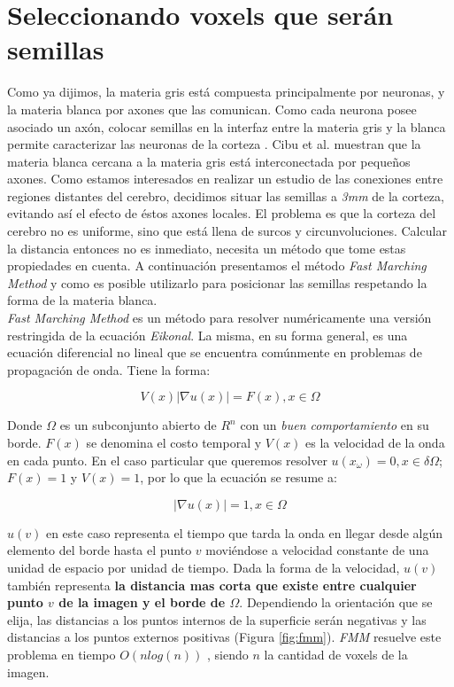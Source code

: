 \section{Seleccionando voxels que ser\'an semillas}
\label{sec:semillas}

Como ya dijimos, la materia gris est\'a compuesta principalmente por neuronas,
y la materia blanca por axones que las comunican. Como cada neurona
posee asociado un ax\'on, colocar semillas en la interfaz entre la materia gris
y la blanca permite caracterizar las neuronas de la corteza \cite{Mori2002}
\cite{Anwander2006}. Cibu et al. \cite{Thomas2014} muestran que la materia blanca
cercana a la materia gris est\'a interconectada por peque\~nos axones. Como
estamos interesados en realizar un estudio de las conexiones entre regiones
distantes del cerebro, decidimos situar las semillas a \textit{3mm} de la corteza,
evitando as\'i el efecto de \'estos axones locales. El problema es que la corteza
del cerebro no es uniforme, sino que est\'a llena de surcos y circunvoluciones. 
Calcular la distancia entonces no es inmediato, necesita un m\'etodo que tome
estas propiedades en cuenta. A continuaci\'on presentamos el m\'etodo
\textit{Fast Marching Method} y como es posible utilizarlo para posicionar las
semillas respetando la forma de la materia blanca. \\

\textit{Fast Marching Method} es un m\'etodo para resolver num\'ericamente una
versi\'on restringida de la ecuaci\'on \textit{Eikonal}. La misma, en su forma
general, es una ecuaci\'on diferencial no lineal que se encuentra com\'unmente 
en problemas de propagaci\'on de onda. Tiene la forma: 

$$ V(x) | \nabla u(x) | = F(x) , x \in \Omega $$ 

Donde $\Omega$ es un subconjunto abierto de $R^n$ con un
\textit{buen comportamiento} en su borde. $F(x)$ se denomina el costo temporal y
$V(x)$ es la velocidad de la onda en cada punto. En el caso particular que
queremos resolver $u(x_\omega) = 0, x \in \delta\Omega$;  $F(x)=1$ y $V(x)=1$,
por lo que la ecuaci\'on se resume a:

$$ | \nabla u(x) | = 1 , x \in \Omega $$ 

$u(v)$ en este caso representa el tiempo que tarda la onda en llegar desde
alg\'un elemento del borde hasta el punto $v$ movi\'endose a velocidad constante
de una unidad de espacio por unidad de tiempo. Dada la forma de la velocidad, 
$u(v)$ tambi\'en representa \textbf{la distancia mas corta que existe entre cualquier
punto $v$ de la imagen y el borde de $\Omega$}. Dependiendo la orientaci\'on que 
se elija, las distancias a los puntos internos de la superficie ser\'an negativas
y las distancias a los puntos externos positivas (Figura \ref{fig:fmm}). 
\textit{FMM} resuelve este problema en tiempo $O(n log(n))$ \cite{Sethian2001},
siendo $n$ la cantidad de voxels de la imagen.\\

